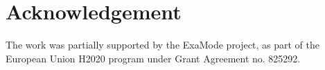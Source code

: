 \documentclass[preprint,12pt,sort&compress]{elsarticle}
\begin{document}
\begin{frontmatter}





\end{frontmatter}

\linenumbers



















\section*{Acknowledgement}
The work was partially supported by the ExaMode project, as part of the European Union H2020 program under Grant Agreement no. 825292. 






%

%








\end{document}
